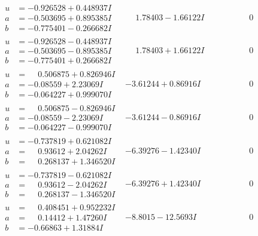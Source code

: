 \documentclass[1p]{elsarticle_modified}
\theoremstyle{definition}
\begin{document}
$$\begin{array}{c|c|c}
\begin{aligned}
u &= -0.926528 + 0.448937 I \\
a &= -0.503695 + 0.895385 I \\
b &= -0.775401 - 0.266682 I\end{aligned}
 & \phantom{-}1.78403 - 1.66122 I & \phantom{-0.000000 } 0 \\ \hline\begin{aligned}
u &= -0.926528 - 0.448937 I \\
a &= -0.503695 - 0.895385 I \\
b &= -0.775401 + 0.266682 I\end{aligned}
 & \phantom{-}1.78403 + 1.66122 I & \phantom{-0.000000 } 0 \\ \hline\begin{aligned}
u &= \phantom{-}0.506875 + 0.826946 I \\
a &= -0.08559 + 2.23069 I \\
b &= -0.064227 + 0.999070 I\end{aligned}
 & -3.61244 + 0.86916 I & \phantom{-0.000000 } 0 \\ \hline\begin{aligned}
u &= \phantom{-}0.506875 - 0.826946 I \\
a &= -0.08559 - 2.23069 I \\
b &= -0.064227 - 0.999070 I\end{aligned}
 & -3.61244 - 0.86916 I & \phantom{-0.000000 } 0 \\ \hline\begin{aligned}
u &= -0.737819 + 0.621082 I \\
a &= \phantom{-}0.93612 + 2.04262 I \\
b &= \phantom{-}0.268137 + 1.346520 I\end{aligned}
 & -6.39276 - 1.42340 I & \phantom{-0.000000 } 0 \\ \hline\begin{aligned}
u &= -0.737819 - 0.621082 I \\
a &= \phantom{-}0.93612 - 2.04262 I \\
b &= \phantom{-}0.268137 - 1.346520 I\end{aligned}
 & -6.39276 + 1.42340 I & \phantom{-0.000000 } 0 \\ \hline\begin{aligned}
u &= \phantom{-}0.408451 + 0.952232 I \\
a &= \phantom{-}0.14412 + 1.47260 I \\
b &= -0.66863 + 1.31884 I\end{aligned}
 & -8.8015 - 12.5693 I & \phantom{-0.000000 } 0 \\ \hline\begin{aligned}

\end{aligned}
\end{array}$$
\end{document}
